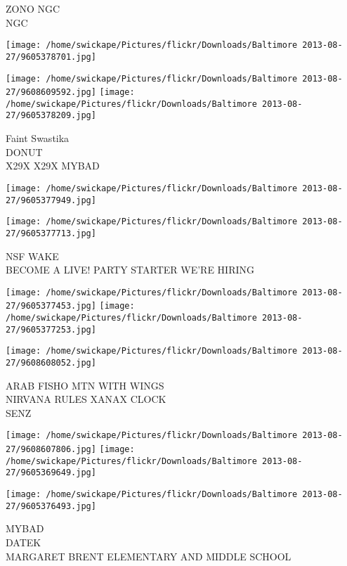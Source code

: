 \documentclass[10pt,letterpaper]{article}
\begin{document}
ZONO NGC\\
NGC
\pagebreak

\texttt{[image: /home/swickape/Pictures/flickr/Downloads/Baltimore 2013-08-27/9605378701.jpg]}

\vspace{0.25in}
\texttt{[image: /home/swickape/Pictures/flickr/Downloads/Baltimore 2013-08-27/9608609592.jpg]}
\texttt{[image: /home/swickape/Pictures/flickr/Downloads/Baltimore 2013-08-27/9605378209.jpg]}

Faint Swastika\\
DONUT\\
X29X X29X MYBAD
\pagebreak

\texttt{[image: /home/swickape/Pictures/flickr/Downloads/Baltimore 2013-08-27/9605377949.jpg]}

\vspace{0.25in}
\texttt{[image: /home/swickape/Pictures/flickr/Downloads/Baltimore 2013-08-27/9605377713.jpg]}

NSF WAKE\\
BECOME A LIVE! PARTY STARTER WE'RE HIRING
\pagebreak

\texttt{[image: /home/swickape/Pictures/flickr/Downloads/Baltimore 2013-08-27/9605377453.jpg]}
\texttt{[image: /home/swickape/Pictures/flickr/Downloads/Baltimore 2013-08-27/9605377253.jpg]}

\vspace{0.25in}
\texttt{[image: /home/swickape/Pictures/flickr/Downloads/Baltimore 2013-08-27/9608608052.jpg]}

ARAB FISHO MTN WITH WINGS\\
NIRVANA RULES XANAX CLOCK\\
SENZ
\pagebreak

\texttt{[image: /home/swickape/Pictures/flickr/Downloads/Baltimore 2013-08-27/9608607806.jpg]}
\texttt{[image: /home/swickape/Pictures/flickr/Downloads/Baltimore 2013-08-27/9605369649.jpg]}

\vspace{0.25in}
\texttt{[image: /home/swickape/Pictures/flickr/Downloads/Baltimore 2013-08-27/9605376493.jpg]}

MYBAD\\
DATEK\\
MARGARET BRENT ELEMENTARY AND MIDDLE SCHOOL
\pagebreak
\end{document}
